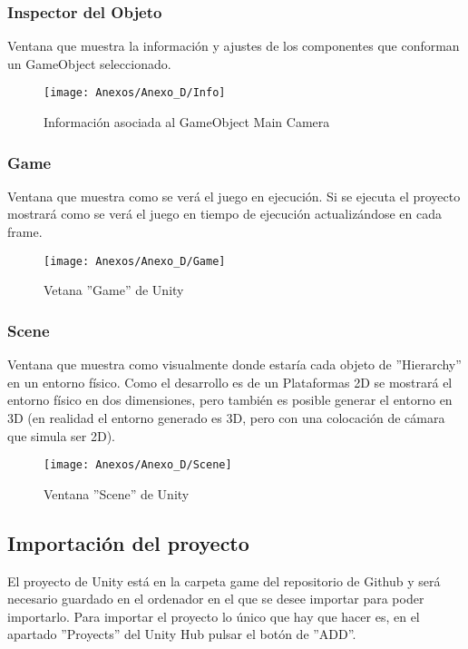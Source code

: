 \subsubsection{Inspector del Objeto}
Ventana que muestra la información y ajustes de los componentes que conforman un GameObject seleccionado.

\begin{figure}[h]
\centering
\texttt{[image: Anexos/Anexo\_D/Info]}
\caption{Información asociada al GameObject Main Camera}
\end{figure}

\subsubsection{Game}
Ventana que muestra como se verá el juego en ejecución. Si se ejecuta el proyecto mostrará como se verá el juego en tiempo de ejecución actualizándose en cada frame.

\begin{figure}[h]
\centering
\texttt{[image: Anexos/Anexo\_D/Game]}
\caption{Vetana ''Game'' de Unity}
\end{figure}

\subsubsection{Scene}
Ventana que muestra como visualmente donde estaría cada objeto de ''Hierarchy'' en un entorno físico. Como el desarrollo es de un Plataformas 2D se mostrará el entorno físico en dos dimensiones, pero también es posible generar el entorno en 3D (en realidad el entorno generado es 3D, pero con una colocación de cámara que simula ser 2D).

\clearpage
\begin{figure}[h]
\centering
\texttt{[image: Anexos/Anexo\_D/Scene]}
\caption{Ventana ''Scene'' de Unity}
\end{figure}

\subsection{Importación del proyecto}
El proyecto de Unity está en la carpeta game del repositorio de Github y será necesario guardado en el ordenador en el que se desee importar para poder importarlo.
Para importar el proyecto lo único que hay que hacer es, en el apartado ''Proyects'' del Unity Hub pulsar el botón de ''ADD''.

